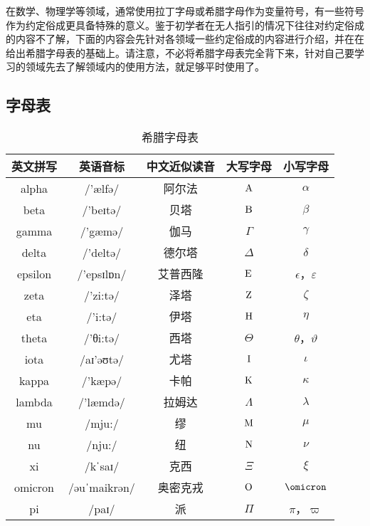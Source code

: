 \begin{issues}
\issueDraft
\end{issues}

在数学、物理学等领域，通常使用拉丁字母或希腊字母作为变量符号，有一些符号作为约定俗成更具备特殊的意义。鉴于初学者在无人指引的情况下往往对约定俗成的内容不了解，下面的内容会先针对各领域一些约定俗成的内容进行介绍，并在在给出希腊字母表的基础上。请注意，不必将希腊字母表完全背下来，针对自己要学习的领域先去了解领域内的使用方法，就足够平时使用了。

\subsection{字母表}

\begin{table}[ht]
\centering
\caption{希腊字母表}\label{tab_GreekL1}
\begin{tabular}{|c|c|c|c|c|}
\hline
英文拼写 & 英语音标 & 中文近似读音 & 大写字母 & 小写字母 \\
\hline
alpha & /'ælfə/&阿尔法 & ${\rm A}$ & $\alpha$ \\
\hline
beta & /'beɪtə/&贝塔 & ${\rm B}$ & $\beta$ \\
\hline
gamma & /'gæmə/&伽马 & $\Gamma$ & $\gamma$ \\
\hline
delta & /'deltə/&德尔塔 &$\Delta$ & $\delta$ \\
\hline
epsilon & /'epsɪlɒn/&艾普西隆 & ${\rm E}$ & $\epsilon$，$\varepsilon$ \\
\hline
zeta & /'zi:tə/&泽塔 & ${\rm Z}$ & $\zeta$ \\
\hline
eta & /'i:tə/&伊塔 & ${\rm H}$ & $\eta$ \\
\hline
theta & /'θi:tə/&西塔 & $\Theta$ & $\theta$，$\vartheta$ \\
\hline
iota & /aɪ'əʊtə/&尤塔 & ${\rm I}$ & $\iota$ \\
\hline
kappa & /'kæpə/&卡帕 & ${\rm K}$ & $\kappa$ \\
\hline
lambda & /'læmdə/&拉姆达 &$\Lambda$ & $\lambda$ \\
\hline
mu & /mju:/&缪 & ${\rm M}$ & $\mu$ \\
\hline
nu & /nju:/&纽 & ${\rm N}$ & $\nu$ \\
\hline
xi & /kˈsaɪ/&克西 &$\Xi$ & $\xi$ \\
\hline
omicron &/əuˈmaikrən/&奥密克戎 & ${\rm O}$ & $\omicron$ \\
\hline
pi & /paɪ/&派 &$\Pi$ & $\pi$，$\varpi$ \\

\end{tabular}
\end{table}
